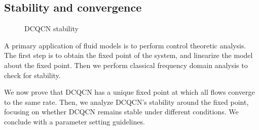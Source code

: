 \subsection{Stability and convergence}
\label{sec:dcqcn_stability}

\begin{figure}[t]
\caption{DCQCN stability}
\label{fig:dcqcn_stability}
\end{figure}

A primary application of fluid models is to perform control theoretic analysis.
The first step is to obtain the fixed point of the system, and linearize the
model about the fixed point. Then we perform classical frequency domain
analysis to check for stability.

We now prove that DCQCN has a unique fixed point at which all flows converge to
the same rate. Then, we analyze DCQCN's stability around the fixed point,
focusing on whether DCQCN remains stable under different conditions. We conclude
with a parameter setting guidelines.

